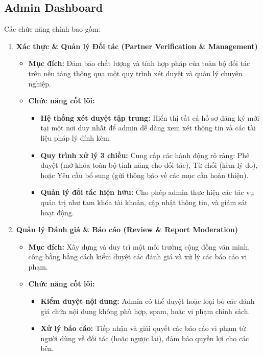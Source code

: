 \subsection{Admin Dashboard}
Các chức năng chính bao gồm:
\begin{enumerate}
    \item \textbf{Xác thực \& Quản lý Đối tác (Partner Verification \& Management)}
    \begin{itemize}
        \item \textbf{Mục đích:} Đảm bảo chất lượng và tính hợp pháp của toàn bộ đối tác trên nền tảng thông qua một quy trình xét duyệt và quản lý chuyên nghiệp.
        \item \textbf{Chức năng cốt lõi:}
        \begin{itemize}
            \item \textbf{Hệ thống xét duyệt tập trung:} Hiển thị tất cả hồ sơ đăng ký mới tại một nơi duy nhất để admin dễ dàng xem xét thông tin và các tài liệu pháp lý đính kèm.
            \item \textbf{Quy trình xử lý 3 chiều:} Cung cấp các hành động rõ ràng: Phê duyệt (mở khóa toàn bộ tính năng cho đối tác), Từ chối (kèm lý do), hoặc Yêu cầu bổ sung (gửi thông báo về các mục cần hoàn thiện).
            \item \textbf{Quản lý đối tác hiện hữu:} Cho phép admin thực hiện các tác vụ quản trị như tạm khóa tài khoản, cập nhật thông tin, và giám sát hoạt động.
        \end{itemize}
    \end{itemize}
    \item \textbf{Quản lý Đánh giá \& Báo cáo (Review \& Report Moderation)}
    \begin{itemize}
        \item \textbf{Mục đích:} Xây dựng và duy trì một môi trường cộng đồng văn minh, công bằng bằng cách kiểm duyệt các đánh giá và xử lý các báo cáo vi phạm.
        \item \textbf{Chức năng cốt lõi:}
        \begin{itemize}
            \item \textbf{Kiểm duyệt nội dung:} Admin có thể duyệt hoặc loại bỏ các đánh giá chứa nội dung không phù hợp, spam, hoặc vi phạm chính sách.
            \item \textbf{Xử lý báo cáo:} Tiếp nhận và giải quyết các báo cáo vi phạm từ người dùng về đối tác (hoặc ngược lại), đảm bảo quyền lợi cho các bên.
        \end{itemize}
    \end{itemize} 

\end{enumerate}
